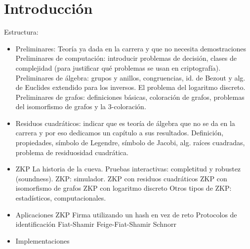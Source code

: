 \chapter{Introducción}\label{ch:introduction}

Estructura:
\begin{itemize}
	\item Preliminares: Teoría ya dada en la carrera y que no necesita demostraciones
		\subitem Preliminares de computación: introducir problemas de decisión, clases de complejidad (para justificar qué problemas se usan en criptografía).
		\subitem Preliminares de álgebra: grupos y anillos, congruencias, id. de Bezout y alg. de Euclides extendido para los inversos. El problema del logaritmo discreto.
		\subitem Preliminares de grafos: definiciones básicas, coloración de grafos, problemas del isomorfismo de grafos y la 3-coloración.
		
	\item Residuos cuadráticos: indicar que es teoría de álgebra que no se da en la carrera y por eso dedicamos un capítulo a sus resultados.
		\subitem Definición, propiedades, símbolo de Legendre, símbolo de Jacobi, alg. raíces cuadradas, problema de residuosidad cuadrática.
		
	\item ZKP
		\subitem La historia de la cueva.
		\subitem Pruebas interactivas: completitud y robustez (soundness).
		\subitem ZKP: simulador.
			\subsubitem ZKP con residuos cuadráticos
			\subsubitem ZKP con isomorfismo de grafos
			\subsubitem ZKP con logaritmo discreto
		\subitem Otros tipos de ZKP: estadísticos, computacionales.
		
	\item Aplicaciones ZKP
		\subitem Firma utilizando un hash en vez de reto
		\subitem Protocolos de identificación
			\subsubitem Fiat-Shamir
			\subsubitem Feige-Fiat-Shamir
			\subsubitem Schnorr
			
			
	\item Implementaciones
\end{itemize}